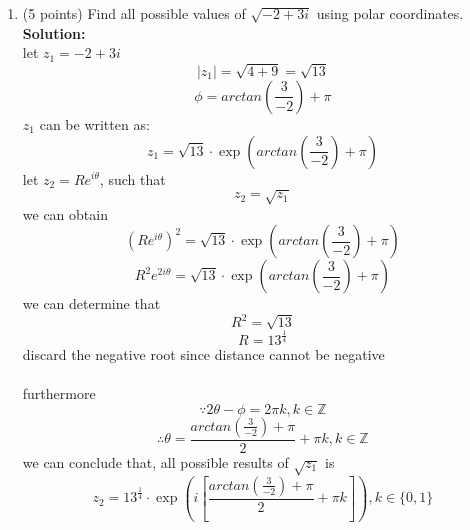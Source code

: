 \documentclass[12pt]{article}
\begin{document}
\begin{enumerate}
\item (5 points) Find all possible values of $\sqrt{-2+3i}$ using polar coordinates.\\
\textbf{Solution:}\\
let $z_1=-2+3i$
\[
|z_1|=\sqrt{4+9}=\sqrt{13}
\]
\[
\phi=arctan(\frac{3}{-2})+\pi
\]
$z_1$ can be written as:\\
\[
z_1=\sqrt{13}\cdot\exp{(arctan(\frac{3}{-2})+\pi)}
\]
let $z_2=Re^{i\theta}$, such that
\[
z_2=\sqrt{z_1}
\]
we can obtain
\[
(Re^{i\theta})^2=\sqrt{13}\cdot\exp{(arctan(\frac{3}{-2})+\pi)}
\]
\[
R^2e^{2i\theta}=\sqrt{13}\cdot\exp{(arctan(\frac{3}{-2})+\pi)}
\]
we can determine that
\[
R^2=\sqrt{13}
\]
\[
R=13^{\frac{1}{4}}
\]
discard the negative root since distance cannot be negative\\\\
furthermore
\[
\because 2\theta-\phi=2\pi k, k\in\mathbb{Z} 
\]
\[
\therefore \theta=\frac{arctan(\frac{3}{-2})+\pi}{2}+\pi k,k\in\mathbb{Z}
\]
we can conclude that, all possible results of $\sqrt{z_1}$ is
\[
z_2=13^{\frac{1}{4}}\cdot \exp(i[\frac{arctan(\frac{3}{-2})+\pi}{2}+\pi k]), k\in\{0,1\}
\]
\end{enumerate}
\end{document}
